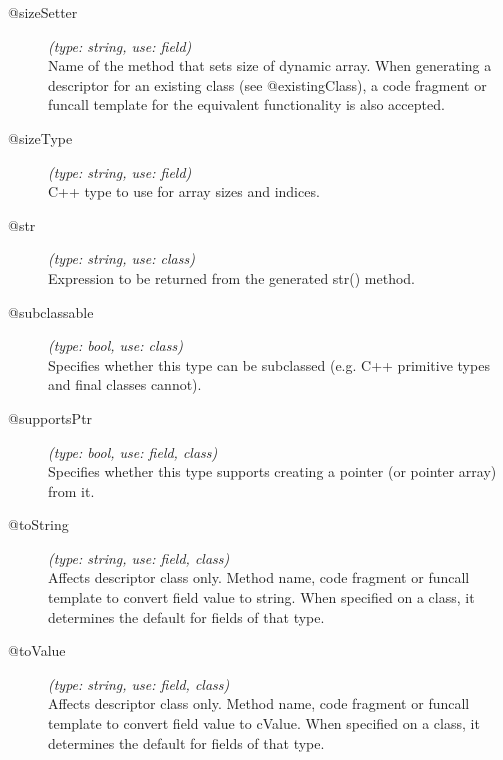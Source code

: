 \begin{description}
\item[@sizeSetter] \textit{(type: string, use: field)} \\
  Name of the method that sets size of dynamic array. When generating a
  descriptor for an existing class (see @existingClass), a code fragment or
  funcall template for the equivalent functionality is also accepted.

\item[@sizeType] \textit{(type: string, use: field)} \\
  C++ type to use for array sizes and indices.

\item[@str] \textit{(type: string, use: class)} \\
  Expression to be returned from the generated str() method.

\item[@subclassable] \textit{(type: bool, use: class)} \\
  Specifies whether this type can be subclassed (e.g. C++ primitive types and
  final classes cannot).

\item[@supportsPtr] \textit{(type: bool, use: field, class)} \\
  Specifies whether this type supports creating a pointer (or pointer array)
  from it.

\item[@toString] \textit{(type: string, use: field, class)} \\
  Affects descriptor class only. Method name, code fragment or funcall
  template to convert field value to string. When specified on a class, it
  determines the default for fields of that type.

\item[@toValue] \textit{(type: string, use: field, class)} \\
  Affects descriptor class only. Method name, code fragment or funcall
  template to convert field value to cValue. When specified on a class, it
  determines the default for fields of that type.

\end{description}


